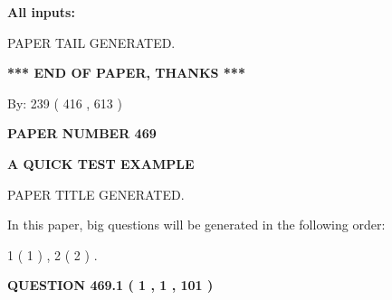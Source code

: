 \documentclass[12pt]{article}
\begin{document}
   
   
   
\noindent{}
   
   
   
   
\noindent\vspace{0.1in}\hspace{-0.08in} {\textbf{\Large{All inputs: }}}
   
   
   
   
   
   
 \vspace{0.2in}
 
   
   
\vspace{2.0in} PAPER TAIL GENERATED.
   
   
   
   
\vspace{1.0in} 
{\textbf{\large{ *** END OF PAPER, THANKS *** }}} 
   
   
\hspace{1.0in} By: 
 239 ( 416 ,  613 )
   
   
   
   
\newpage 
\setcounter{page}{ 
   469001 } 
   
   
   
   
 {\textbf{ \Large{ PAPER NUMBER  469  }}}
   
   
\vspace{0.2in}
   
   
   
   
   
   
   
   
 \vspace{0.2in}
{\LARGE {\textbf{ A QUICK TEST EXAMPLE}}}
   
   
 PAPER TITLE GENERATED.
   
   
   
\vspace{0.2in}
   
In this paper, big questions will be generated in the following order: 
   
   
   1 ( 1 )
 ,
   2 ( 2 )
 .
  
\vspace{0.2in}
  
{\textbf{\Large{QUESTION
469.1 
 ( 1 , 1 , 101 )
}}}
  
  
 
\end{document}
